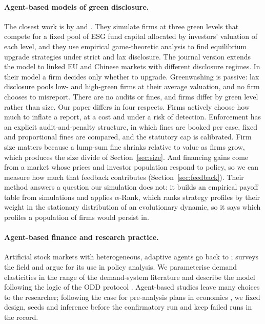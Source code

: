 \documentclass[11pt]{article}
\begin{document}
\paragraph{Agent-based models of green disclosure.} The closest work is by \citet{zhao2025agent} and \citet{zhao2026green}. They simulate firms at three green levels that compete for a fixed pool of ESG fund capital allocated by investors' valuation of each level, and they use empirical game-theoretic analysis to find equilibrium upgrade strategies under strict and lax disclosure. The journal version extends the model to linked EU and Chinese markets with different disclosure regimes. In their model a firm decides only whether to upgrade. Greenwashing is passive: lax disclosure pools low- and high-green firms at their average valuation, and no firm chooses to misreport. There are no audits or fines, and firms differ by green level rather than size. Our paper differs in four respects. Firms actively choose how much to inflate a report, at a cost and under a risk of detection. Enforcement has an explicit audit-and-penalty structure, in which fines are booked per case, fixed and proportional fines are compared, and the statutory cap is calibrated. Firm size matters because a lump-sum fine shrinks relative to value as firms grow, which produces the size divide of Section~\ref{sec:size}. And financing gains come from a market whose prices and investor population respond to policy, so we can measure how much that feedback contributes (Section~\ref{sec:feedback}). Their method answers a question our simulation does not: it builds an empirical payoff table from simulations and applies $\alpha$-Rank, which ranks strategy profiles by their weight in the stationary distribution of an evolutionary dynamic, so it says which profiles a population of firms would persist in.

\paragraph{Agent-based finance and research practice.} Artificial stock markets with heterogeneous, adaptive agents go back to \citet{arthur1997asset}; \citet{lebaron2006agent} surveys the field and \citet{farmer2009economy} argue for its use in policy analysis. We parameterise demand elasticities in the range of the demand-system literature \citep{koijen2019demand} and describe the model following the logic of the ODD protocol \citep{grimm2020odd}. Agent-based studies leave many choices to the researcher; following the case for pre-analysis plans in economics \citep{olken2015promises}, we fixed design, seeds and inference before the confirmatory run and keep failed runs in the record.
\end{document}
